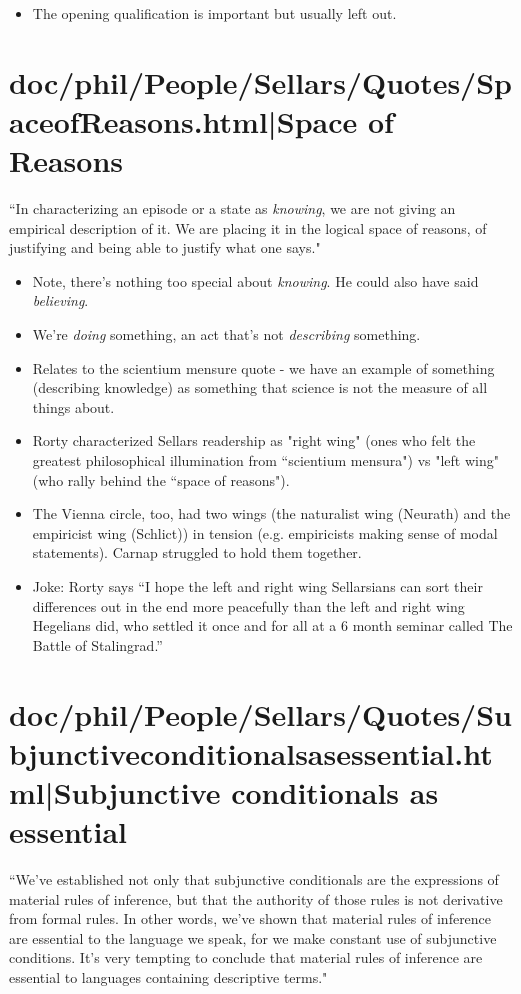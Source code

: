 \documentclass[12pt,a4paper]{report}
\begin{document}
\cite{sellars1956empiricism}

\begin{itemize}
    \item The opening qualification is important but usually left out.
\end{itemize}

\section{doc/phil/People/Sellars/Quotes/SpaceofReasons.html|Space of Reasons}
``In characterizing an episode or a state as \emph{knowing}, we are not giving an empirical description of it. We are placing it in the logical space of reasons, of justifying and being able to justify what one says." \cite{sellars1956empiricism}
    \begin{itemize}
        \item Note, there's nothing too special about \emph{knowing}. He could also have said \emph{believing}.
        \item  We're \emph{doing} something, an act that's not \emph{describing} something.
        \item Relates to the scientium mensure quote - we have an example of something (describing knowledge) as something that science is not the measure of all things about.
        \item Rorty characterized Sellars readership as "right wing" (ones who felt the greatest philosophical illumination from ``scientium mensura") vs "left wing" (who rally behind the ``space of reasons").
        \item The Vienna circle, too, had two wings (the naturalist wing (Neurath) and the empiricist wing (Schlict)) in tension (e.g. empiricists making sense of modal statements). Carnap struggled to hold them together.
        \item Joke: Rorty says ``I hope the left and right wing Sellarsians can sort their differences out in the end more peacefully than the left and right wing Hegelians did, who settled it once and for all at a 6 month seminar called The Battle of Stalingrad.''
    \end{itemize}
\section{doc/phil/People/Sellars/Quotes/Subjunctiveconditionalsasessential.html|Subjunctive conditionals as essential}
``We've established not only that subjunctive conditionals are the expressions of material rules of inference, but that the authority of those rules is not derivative from formal rules. In other words, we've shown that material rules of inference are essential to the language we speak, for we make constant use of subjunctive conditions. It's very tempting to conclude that material rules of inference are essential to languages containing descriptive terms."
\end{document}
